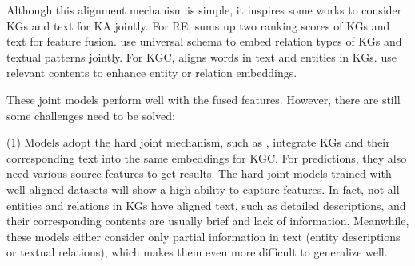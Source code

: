 \documentclass[letterpaper]{article} %
\begin{document}


Although this alignment mechanism is simple, it inspires some works to consider KGs and text for KA jointly. For RE, \cite{weston2013connecting} sums up two ranking scores of KGs and text for feature fusion. \cite{riedel2013relation,vergamccallum} use universal schema to embed relation types of KGs and textual patterns jointly. For KGC, \cite{wang2014knowledge} aligns words in text and entities in KGs. \cite{toutanova2015representing,xie2016representation} use relevant contents to enhance entity or relation embeddings. 

These joint models perform well with the fused features. However, there are still some challenges need to be solved:

(1) Models adopt the hard joint mechanism, such as \cite{zhong2015aligning}, integrate KGs and their corresponding text into the same embeddings for KGC. For predictions, they also need various source features to get results. The hard joint models trained with well-aligned datasets will show a high ability to capture features. In fact, not all entities and relations in KGs have aligned text, such as detailed descriptions, and their corresponding contents are usually brief and lack of information. Meanwhile, these models either consider only partial information in text (entity descriptions or textual relations), which makes them even more difficult to generalize well.

\end{document}
